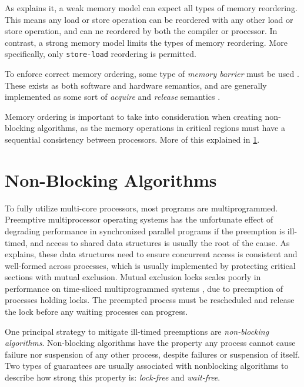 As \citet{preshing2012weakstrong} explains it, a weak memory model can expect all types of memory reordering. This means any load or store operation can be reordered with any other load or store operation, and can ne reordered by both the compiler or processor. In contrast, a strong memory model limits the types of memory reordering. More specifically, only \texttt{store\hyp{}load} reordering is permitted. 

To enforce correct memory ordering, some type of \textit{memory barrier} must be used \citep{preshing2012barriers,preshing2012lockfree}. These exists as both software and hardware semantics, and are generally implemented as some sort of \textit{acquire} and \textit{release} semantics \citep{preshing2012acquire}.

Memory ordering is important to take into consideration when creating non\hyp{}blocking algorithms, as the memory operations in critical regions must have a sequential consistency between processors. More of this explained in \cref{sec:nonblocking_algorithms}.


\section{Non\hyp{}Blocking Algorithms}
\label{sec:nonblocking_algorithms}


To fully utilize multi\hyp{}core processors, most programs are multiprogrammed. Preemptive multiprocessor operating systems has the unfortunate effect of degrading performance in synchronized parallel programs if the preemption is ill\hyp{}timed, and access to shared data structures is usually the root of the cause. As \citet{michael1998nonblocking} explains, these data structures need to ensure concurrent access is consistent and well\hyp{}formed across processes, which is usually implemented by protecting critical sections with mutual exclusion. Mutual exclusion locks scales poorly in performance on time\hyp{}sliced multiprogrammed systems \citep{zahorjan1991effect}, due to preemption of processes holding locks. The preempted process must be rescheduled and release the lock before any waiting processes can progress.

One principal strategy to mitigate ill\hyp{}timed preemptions are \textit{non\hyp{}blocking algorithms}. Non\hyp{}blocking algorithms have the property any process cannot cause failure nor suspension of any other process, despite failures or suspension of itself. Two types of guarantees are usually associated with nonblocking algorithms to describe how strong this property is: \textit{lock\hyp{}free} and \textit{wait\hyp{}free}. 

